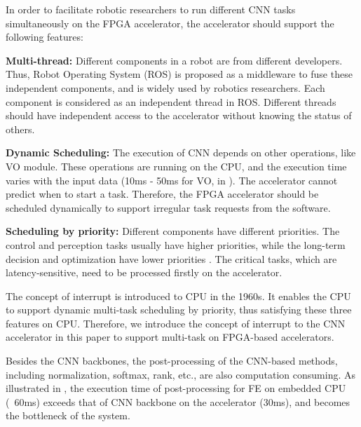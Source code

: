 In order to facilitate robotic researchers to run different CNN tasks simultaneously on the FPGA accelerator, the accelerator should support the following features:

\textbf{Multi-thread:} Different components in a robot are from different developers. Thus, Robot Operating System (ROS) \cite{quigley2009ros} is proposed as a middleware to fuse these independent components, and is widely used by robotics researchers. Each component is considered as an independent thread in ROS. Different threads should have independent access to the accelerator without knowing the status of others.



\textbf{Dynamic Scheduling:} The execution of CNN depends on other operations, like VO module. 
These operations are running on the CPU, and the execution time varies with the input data \cite{mohanan2018survey} (10ms - 50ms for VO, in ). 
The accelerator cannot predict when to start a task. 
Therefore, the FPGA accelerator should be scheduled dynamically to support irregular task requests from the software.

\textbf{Scheduling by priority:} Different components have different priorities. The control and perception tasks usually have higher priorities, while the long-term decision and optimization have lower priorities \cite{RamsauerKLM17}. The critical tasks, which are latency-sensitive,  need to be processed firstly on the accelerator.

The concept of interrupt \cite{jen1974processor} is introduced to CPU in the 1960s. It enables the CPU to support dynamic multi-task scheduling by priority, thus satisfying these three features on CPU. Therefore, we introduce the concept of interrupt to the CNN accelerator in this paper to support multi-task on FPGA-based accelerators.

Besides the CNN backbones, the post-processing of the CNN-based methods, including normalization, softmax, rank, etc., are also computation consuming. As illustrated in , the execution time of post-processing for FE on embedded CPU (~60ms) exceeds that of CNN backbone on the accelerator (30ms), and becomes the bottleneck of the system.

